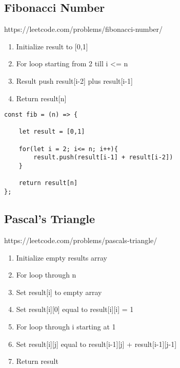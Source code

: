 \documentclass[10pt]{article}
\begin{document}
\medskip %







\pagebreak %
\medskip   
\subsection{Fibonacci Number}
https://leetcode.com/problems/fibonacci-number/

\begin{enumerate}
	\item Initialize result to [0,1]
	\item For loop starting from 2 till i <= n
	\item Result push result[i-2] plus result[i-1]
	\item Return result[n]
\end{enumerate}

\begin{lstlisting}[title=Solution fib, captionpos=t]
const fib = (n) => {
    
    let result = [0,1]
    
    for(let i = 2; i<= n; i++){
        result.push(result[i-1] + result[i-2])
    }
    
    return result[n]
};
\end{lstlisting}
\medskip %







\pagebreak %
\medskip   
\subsection{Pascal's Triangle}
https://leetcode.com/problems/pascals-triangle/

\begin{enumerate}
	\item Initialize empty results array
	\item For loop through n 
	\item Set result[i] to empty array 
	\item Set result[i][0] equal to result[i][i] = 1
	\item For loop through i starting at 1
	\item Set result[i][j] equal to result[i-1][j] + result[i-1][j-1]
	\item Return result
\end{enumerate}
\end{document}

